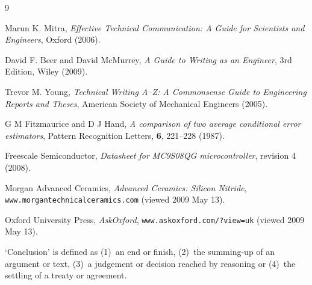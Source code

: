 \begin{thebibliography}{9}
Marun K. Mitra,
\textit{Effective Technical Communication: A Guide for Scientists and Engineers},
Oxford
(2006).

David F. Beer and David McMurrey,
\textit{A Guide to Writing as an Engineer},
3rd Edition,
Wiley
(2009).

Trevor M. Young,
\textit{Technical Writing A--Z: A Commonsense Guide to Engineering Reports and Theses},
American Society of Mechanical Engineers
(2005).

G M Fitzmaurice and D J Hand, 
\textit{A comparison of two average conditional error estimators}, 
Pattern Recognition Letters, 
\textbf{6}, 
221--228 
(1987).

Freescale Semiconductor,
\textit{Datasheet for MC9S08QG microcontroller},
revision 4
(2008).

Morgan Advanced Ceramics, 
\textit{Advanced Ceramics: Silicon Nitride}, \texttt{www.morgantechnicalceramics.com} 
(viewed 2009 May 13).

Oxford University Press, 
\textit{AskOxford},
\texttt{www.askoxford.com/?view=uk}
(viewed 2009 May 13).

`Conclusion' is defined as (1)~an end or finish, (2)~the summing-up of an argument or text, (3)~a judgement or decision reached by reasoning or (4)~the settling of a treaty or agreement.
\end{thebibliography}
\clearpage %